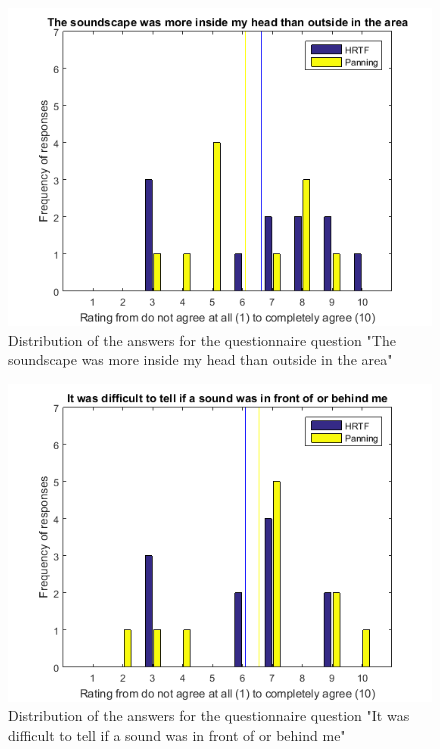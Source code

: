 \documentclass[journal]{IEEEtran}
\begin{document}
\begin{appendices}
\begin{figure}[h!]
  \centering
    \includegraphics[scale=0.7]{graphics/qq4.png}
   \caption{Distribution of the answers for the questionnaire question "The soundscape was more inside my head than outside in the area"}
  \label{fig:plt1}
\end{figure}

\begin{figure}[h!]
  \centering
    \includegraphics[scale=0.7]{graphics/qq5.png}
   \caption{Distribution of the answers for the questionnaire question "It was difficult to tell if a sound was in front of or behind me"}
  \label{fig:plt1}
\end{figure}


\end{appendices}
\pagebreak



\end{document}
